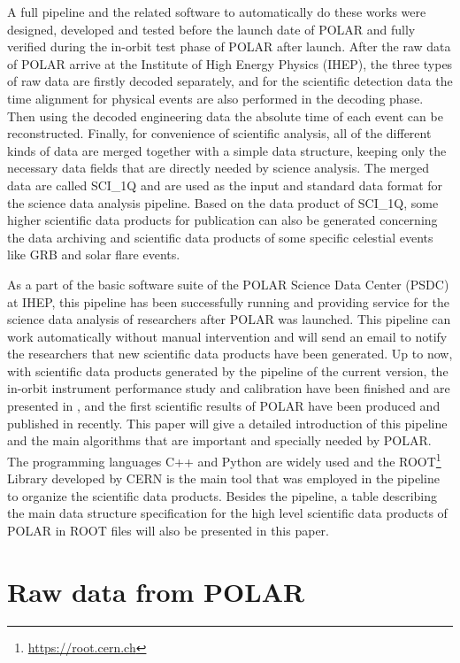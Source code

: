 \documentclass{raa}
\begin{document}
A full pipeline and the related software to automatically do these works were designed, developed and tested before the launch date of POLAR and fully verified during the in-orbit test phase of POLAR after launch. After the raw data of POLAR arrive at the Institute of High Energy Physics (IHEP), the three types of raw data are firstly decoded separately, and for the scientific detection data the time alignment for physical events are also performed in the decoding phase. Then using the decoded engineering data the absolute time of each event can be reconstructed. Finally, for convenience of scientific analysis, all of the different kinds of data are merged together with a simple data structure, keeping only the necessary data fields that are directly needed by science analysis. The merged data are called SCI\_1Q and are used as the input and standard data format for the science data analysis pipeline. Based on the data product of SCI\_1Q, some higher scientific data products for publication can also be generated concerning the data archiving and scientific data products of some specific celestial events like GRB and solar flare events.

As a part of the basic software suite of the POLAR Science Data Center (PSDC) at IHEP, this pipeline has been successfully running and providing service for the science data analysis of researchers after POLAR was launched. This pipeline can work automatically without manual intervention and will send an email to notify the researchers that new scientific data products have been generated. Up to now, with scientific data products generated by the pipeline of the current version, the in-orbit instrument performance study and calibration have been finished and are presented in \citealt{LI20188}, and the first scientific results of POLAR have been produced and published in \citealt{Zhang.Kole.2019} recently. This paper will give a detailed introduction of this pipeline and the main algorithms that are important and specially needed by POLAR. The programming languages C++ and Python are widely used and the ROOT\footnote{\url{https://root.cern.ch}} Library developed by CERN is the main tool that was employed in the pipeline to organize the scientific data products. Besides the pipeline, a table describing the main data structure specification for the high level scientific data products of POLAR in ROOT files will also be presented in this paper.

\section{Raw data from POLAR}\label{sec:raw_data}
\end{document}

